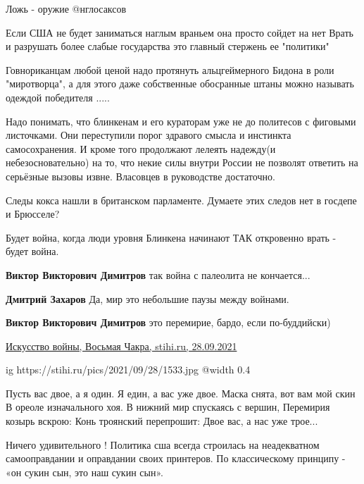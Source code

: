 \begin{itemize}
Ложь - оружие @нглосаксов


Если США не будет заниматься наглым враньем она просто сойдет на нет Врать и
разрушать более слабые государства это главный стержень ее "политики"


Говнориканцам любой ценой надо протянуть альцгеймерного Бидона в роли
"миротворца", а для этого даже собственные обосранные штаны можно называть
одеждой победителя .....


Надо понимать, что блинкенам и его кураторам уже не до политесов с фиговыми
листочками. Они переступили порог здравого смысла и инстинкта самосохранения. И
кроме того продолжают лелеять надежду(и небезосновательно) на то, что некие
силы внутри России не позволят ответить на серьёзные вызовы извне. Власовцев в
руководстве достаточно.


Следы кокса нашли в британском парламенте.
Думаете этих следов нет в госдепе и Брюсселе?

Будет война, когда люди уровня Блинкена начинают ТАК откровенно врать - будет война.

\begin{itemize} %
\textbf{Виктор Викторович Димитров} так война с палеолита не кончается...

\textbf{Дмитрий Захаров} Да, мир это небольшие паузы между войнами.

\textbf{Виктор Викторович Димитров} это перемирие, бардо, если по-буддийски) 

\href{https://stihi.ru/2021/09/28/1533}{%
Искусство войны, Восьмая Чакра, stihi.ru, 28.09.2021%
}

\ifcmt
  ig https://stihi.ru/pics/2021/09/28/1533.jpg
  @width 0.4
\fi

\obeycr
Пусть вас двое, а я один.
Я един, а вас уже двое.
Маска снята, вот вам мой скин
В ореоле изначального хоя.
\smallskip
В нижний мир спускаясь с вершин,
Перемирия козырь вскрою:
Конь троянский перепрошит:
Двое вас, а нас уже трое...
\restorecr

\end{itemize} %


Ничего удивительного ! Политика сша всегда строилась на неадекватном
самооправдании и оправдании своих принтеров. По классическому принципу - «он
сукин сын, это наш сукин сын».



\end{itemize}
